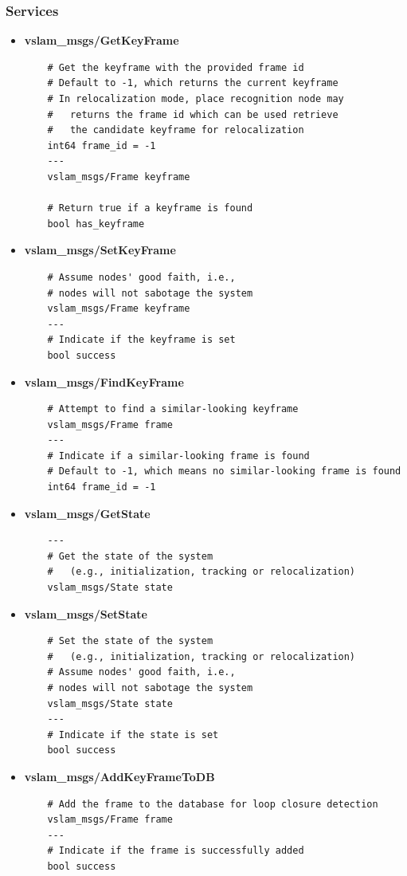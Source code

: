 \subsubsection{Services}

\begin{itemize}
  \item \textbf{vslam\_msgs/GetKeyFrame}
  \begin{verbatim}
    # Get the keyframe with the provided frame id
    # Default to -1, which returns the current keyframe
    # In relocalization mode, place recognition node may 
    #   returns the frame id which can be used retrieve 
    #   the candidate keyframe for relocalization
    int64 frame_id = -1
    ---
    vslam_msgs/Frame keyframe
    
    # Return true if a keyframe is found
    bool has_keyframe
  \end{verbatim}

  \item \textbf{vslam\_msgs/SetKeyFrame}
  \begin{verbatim}
    # Assume nodes' good faith, i.e.,
    # nodes will not sabotage the system
    vslam_msgs/Frame keyframe
    ---
    # Indicate if the keyframe is set
    bool success
  \end{verbatim}

  \item \textbf{vslam\_msgs/FindKeyFrame}
  \begin{verbatim}
    # Attempt to find a similar-looking keyframe
    vslam_msgs/Frame frame
    ---
    # Indicate if a similar-looking frame is found
    # Default to -1, which means no similar-looking frame is found
    int64 frame_id = -1
  \end{verbatim}

  \item \textbf{vslam\_msgs/GetState}
  \begin{verbatim}
    ---
    # Get the state of the system 
    #   (e.g., initialization, tracking or relocalization)
    vslam_msgs/State state
  \end{verbatim}

  \item \textbf{vslam\_msgs/SetState}
  \begin{verbatim}
    # Set the state of the system 
    #   (e.g., initialization, tracking or relocalization)
    # Assume nodes' good faith, i.e.,
    # nodes will not sabotage the system
    vslam_msgs/State state
    ---
    # Indicate if the state is set
    bool success
  \end{verbatim}

  \item \textbf{vslam\_msgs/AddKeyFrameToDB}
  \begin{verbatim}
    # Add the frame to the database for loop closure detection
    vslam_msgs/Frame frame
    ---
    # Indicate if the frame is successfully added
    bool success
  \end{verbatim}
\end{itemize}

